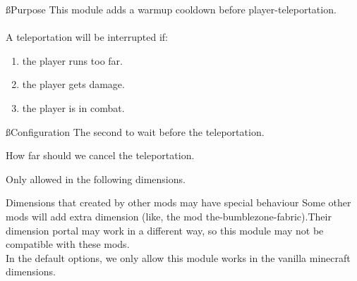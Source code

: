 
\ss{Purpose}
This module adds a warmup cooldown before player-teleportation.
\\\\
A teleportation will be interrupted if:
\begin{enumerate}
    \item the player runs too far.
    \item the player gets damage.
    \item the player is in combat.
\end{enumerate}

\ss{Configuration}
The second to wait before the teleportation.

How far should we cancel the teleportation.

Only allowed in the following dimensions.

\begin{warn}{Dimensions that created by other mods may have special behaviour}
    Some other mods will add extra dimension (like, the mod the-bumblezone-fabric).Their dimension portal may work in a different way, so this module may not be compatible with these mods.
    \\
    In the default options, we only allow this module works in the vanilla minecraft dimensions.
\end{warn}
